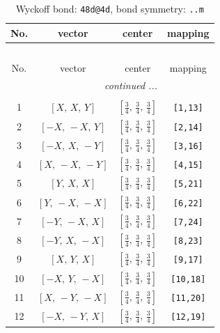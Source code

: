 \documentclass[fleqn,8pt]{jsarticle}
\begin{document}
\begin{longtable}{cccc}
\caption{Wyckoff bond: {\tt 48d@4d}, bond symmetry: {\tt ..m}}
 \\
 \hline \hline
No. & vector & center & mapping \\ \hline \endfirsthead

\multicolumn{3}{l}{\tablename\ \thetable{}} \\
 \hline \hline
No. & vector & center & mapping \\ \hline \endhead

 \hline \hline
\multicolumn{3}{r}{\footnotesize\it continued ...} \\ \endfoot

 \hline \hline
\multicolumn{3}{r}{} \\ \endlastfoot

1 & $\left[ X,\, X,\, Y \right]$ & $\left[ \frac{3}{4},\, \frac{3}{4},\, \frac{3}{4} \right]$ & {\tt [1,13]} \\ \hline
2 & $\left[ - X,\, - X,\, Y \right]$ & $\left[ \frac{3}{4},\, \frac{3}{4},\, \frac{3}{4} \right]$ & {\tt [2,14]} \\ \hline
3 & $\left[ - X,\, X,\, - Y \right]$ & $\left[ \frac{3}{4},\, \frac{3}{4},\, \frac{3}{4} \right]$ & {\tt [3,16]} \\ \hline
4 & $\left[ X,\, - X,\, - Y \right]$ & $\left[ \frac{3}{4},\, \frac{3}{4},\, \frac{3}{4} \right]$ & {\tt [4,15]} \\ \hline
5 & $\left[ Y,\, X,\, X \right]$ & $\left[ \frac{3}{4},\, \frac{3}{4},\, \frac{3}{4} \right]$ & {\tt [5,21]} \\ \hline
6 & $\left[ Y,\, - X,\, - X \right]$ & $\left[ \frac{3}{4},\, \frac{3}{4},\, \frac{3}{4} \right]$ & {\tt [6,22]} \\ \hline
7 & $\left[ - Y,\, - X,\, X \right]$ & $\left[ \frac{3}{4},\, \frac{3}{4},\, \frac{3}{4} \right]$ & {\tt [7,24]} \\ \hline
8 & $\left[ - Y,\, X,\, - X \right]$ & $\left[ \frac{3}{4},\, \frac{3}{4},\, \frac{3}{4} \right]$ & {\tt [8,23]} \\ \hline
9 & $\left[ X,\, Y,\, X \right]$ & $\left[ \frac{3}{4},\, \frac{3}{4},\, \frac{3}{4} \right]$ & {\tt [9,17]} \\ \hline
10 & $\left[ - X,\, Y,\, - X \right]$ & $\left[ \frac{3}{4},\, \frac{3}{4},\, \frac{3}{4} \right]$ & {\tt [10,18]} \\ \hline
11 & $\left[ X,\, - Y,\, - X \right]$ & $\left[ \frac{3}{4},\, \frac{3}{4},\, \frac{3}{4} \right]$ & {\tt [11,20]} \\ \hline
12 & $\left[ - X,\, - Y,\, X \right]$ & $\left[ \frac{3}{4},\, \frac{3}{4},\, \frac{3}{4} \right]$ & {\tt [12,19]} \\
\end{longtable}
\end{document}
